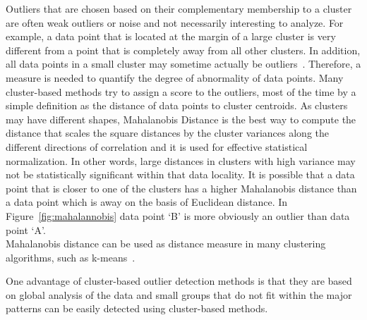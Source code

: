 \begin{description}
	Outliers that are chosen based on their complementary membership to a cluster are often weak outliers or noise and not necessarily interesting to analyze. For example, a data point that is located at the margin of a large cluster is very different from a point that is completely away from all other clusters. In addition, all data points in a small cluster may sometime actually be outliers~\cite{aggarwal2013}. Therefore, a measure is needed to quantify the degree of abnormality of data points. Many cluster-based methods try to assign a score to the outliers, most of the time by a simple definition as the distance of data points to cluster centroids. As clusters may have different shapes, Mahalanobis Distance is the best way to compute the distance that scales the square distances by the cluster variances along the different directions of correlation and it is used for effective statistical normalization. In other words, large distances in clusters with high variance may not be statistically significant within that data locality. It is possible that a data point that is closer to one of the clusters has a higher Mahalanobis distance than a data point which is away on the basis of Euclidean distance. In Figure~\ref{fig:mahalannobis} data point `B' is more obviously an outlier than data point `A'.
	\\
	Mahalanobis distance can be used as distance measure in many clustering algorithms, such as k-means~\cite{Weinberger2009, ChawlaG13}.
	
	One advantage of cluster-based outlier detection methods is that they are based on global analysis of the data and small groups that do not fit within the major patterns can be easily detected using cluster-based methods.


\end{description}
